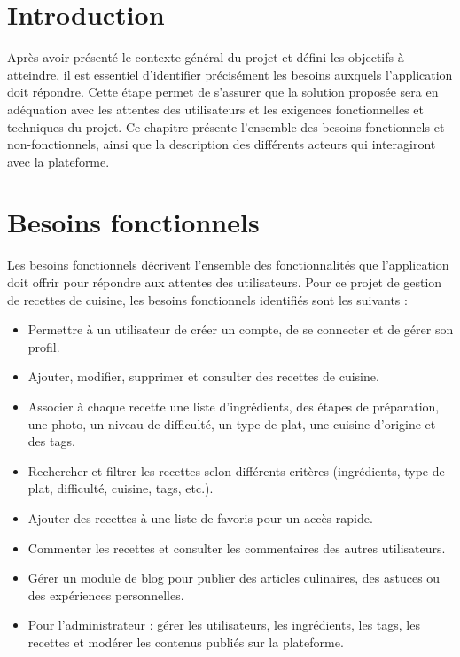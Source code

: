 \documentclass[12pt,a4paper]{report}
\begin{document}
\section*{Introduction}

Après avoir présenté le contexte général du projet et défini les objectifs à atteindre, il est essentiel d’identifier précisément les besoins auxquels l’application doit répondre. Cette étape permet de s’assurer que la solution proposée sera en adéquation avec les attentes des utilisateurs et les exigences fonctionnelles et techniques du projet. Ce chapitre présente l’ensemble des besoins fonctionnels et non-fonctionnels, ainsi que la description des différents acteurs qui interagiront avec la plateforme.
\section{Besoins fonctionnels}

Les besoins fonctionnels décrivent l’ensemble des fonctionnalités que l’application doit offrir pour répondre aux attentes des utilisateurs. Pour ce projet de gestion de recettes de cuisine, les besoins fonctionnels identifiés sont les suivants :

\begin{itemize}[label=•]
    \item Permettre à un utilisateur de créer un compte, de se connecter et de gérer son profil.
    \item Ajouter, modifier, supprimer et consulter des recettes de cuisine.
    \item Associer à chaque recette une liste d’ingrédients, des étapes de préparation, une photo, un niveau de difficulté, un type de plat, une cuisine d’origine et des tags.
    \item Rechercher et filtrer les recettes selon différents critères (ingrédients, type de plat, difficulté, cuisine, tags, etc.).
    \item Ajouter des recettes à une liste de favoris pour un accès rapide.
    \item Commenter les recettes et consulter les commentaires des autres utilisateurs.
    \item Gérer un module de blog pour publier des articles culinaires, des astuces ou des expériences personnelles.
    \item Pour l’administrateur : gérer les utilisateurs, les ingrédients, les tags, les recettes et modérer les contenus publiés sur la plateforme.
\end{itemize}
\end{document}
